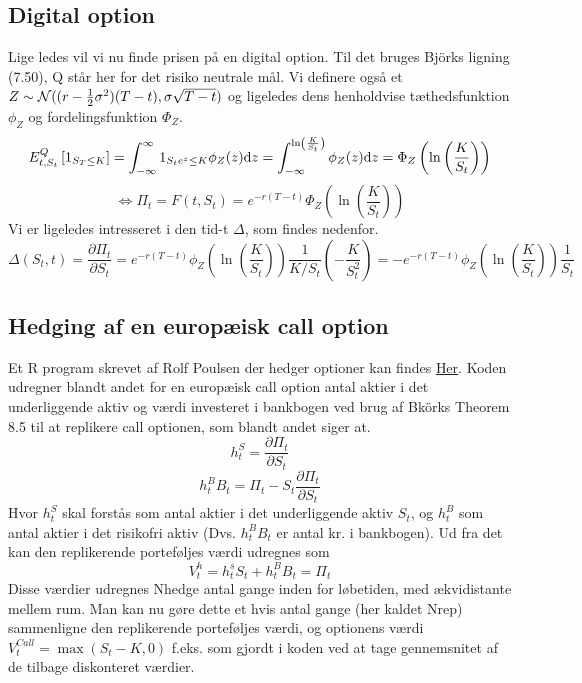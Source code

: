 \documentclass{article}
\theoremstyle{definition}
\theoremstyle{remark}
\newcommand\ens{\Leftrightarrow}
\begin{document}
\subsection{Digital option}
Lige ledes vil vi nu finde prisen på en digital option. Til det bruges Björks ligning (7.50), Q står her for det risiko neutrale mål. Vi definere også et $\\Z\sim\mathcal N((r-\frac12\sigma^2)(T-t),\sigma\sqrt{T-t})$ og ligeledes dens henholdvise tæthedsfunktion $\phi_Z$ og fordelingsfunktion $\Phi_Z$. 
$$E^Q_{t,S_t}\left[1_{S_T\leq K}\right]=\int_{-\infty}^{\infty}1_{S_te^{z}\leq K}\phi_Z(z)\text dz=\int_{-\infty}^{\ln\left(\frac K{S_t}\right)}\phi_Z(z)\text d z=\Phi_Z\left(\ln\left(\frac{K}{S_t}\right)\right)$$
$$\ens \Pi_t=F(t,S_t)=e^{-r(T-t)}\Phi_Z\left(\ln\left(\frac{K}{S_t}\right)\right)$$
Vi er ligeledes intresseret i den tid-t $\Delta$, som findes nedenfor.
$$\Delta(S_t,t)=\frac{\partial \Pi_t}{\partial S_t}=e^{-r(T-t)}\phi_Z\left(\ln\left(\frac{K}{S_t}\right)\right)\frac{1}{K/S_t}\left(-\frac{K}{S_t^2}\right)=-e^{-r(T-t)}\phi_Z\left(\ln\left(\frac{K}{S_t}\right)\right)\frac{1}{S_t}$$

\subsection{Hedging af en europæisk call option}
Et R program skrevet af Rolf Poulsen der hedger optioner kan findes \href{https://www.dropbox.com/s/ykq11phsrk2ho89/DiscreteBlackScholesDeltaHegdeOfCall.R?dl=0}{Her}. Koden udregner blandt andet for en europæisk call option antal aktier i det underliggende aktiv og værdi investeret i bankbogen ved brug af Bkörks Theorem 8.5 til at replikere call optionen, som blandt andet siger at.
$$h^S_t=\frac{\partial \Pi_t}{\partial S_t}$$
$$h^B_tB_t=\Pi_t-S_t\frac{\partial \Pi_t}{\partial S_t}$$
Hvor $h^S_t$ skal forstås som antal aktier i det underliggende aktiv $S_t$, og $h^B_t$ som antal aktier i det risikofri aktiv (Dvs. $h^B_tB_t$ er antal kr. i bankbogen). Ud fra det kan den replikerende porteføljes værdi udregnes som
$$V^h_t=h^s_tS_t+h^B_tB_t=\Pi_t$$
Disse værdier udregnes Nhedge antal gange inden for løbetiden, med ækvidistante mellem rum. Man kan nu gøre dette et hvis antal gange (her kaldet Nrep) sammenligne den replikerende porteføljes værdi, og optionens værdi $V^{Call}_t=\max(S_t-K,0)$ f.eks. som gjordt i koden ved at tage gennemsnitet af de tilbage diskonteret værdier. 
\end{document}
